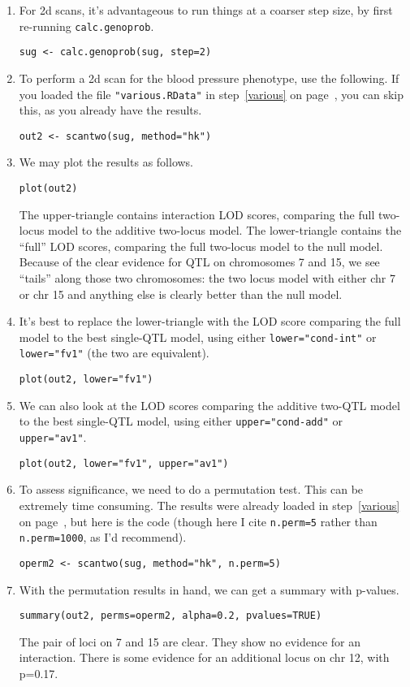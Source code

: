 \documentclass[10pt,letterpaper]{article}
\newcommand{\usercolor}{\color [named]{BlueViolet}}
\begin{document}
\begin{enumerate}
\addtocounter{enumi}{45}
\item For 2d scans, it's advantageous to run things at a coarser step
  size, by first re-running \verb-calc.genoprob-.

\usercolor
\verb|sug <- calc.genoprob(sug, step=2)|
\normalcolor

\item To perform a 2d scan for the blood pressure phenotype, use the
  following.  If you loaded the file \verb-"various.RData"- in
  step~\ref{various} on page~\pageref{various},
  you can skip this, as you already have the results.

\usercolor
\verb|out2 <- scantwo(sug, method="hk")|
\normalcolor

\item We may plot the results as follows.

\usercolor
\verb|plot(out2)|
\normalcolor

The upper-triangle contains interaction LOD scores, comparing the full
two-locus model to the additive two-locus model.  The lower-triangle
contains the ``full'' LOD scores, comparing the full two-locus model
to the null model.  Because of the clear evidence for QTL on
chromosomes 7 and 15, we see ``tails'' along those two chromosomes:
the two locus model with either chr 7 or chr 15 and anything else is clearly better
than the null model.  

\item It's best to replace the lower-triangle with the LOD score comparing the full model to
  the best single-QTL model, using either \verb:lower="cond-int": or
  \verb:lower="fv1": (the two are equivalent).

\usercolor
\verb|plot(out2, lower="fv1")|
\normalcolor

\item We can also look at the LOD scores comparing the additive
  two-QTL model to the best single-QTL model, using either
  \verb:upper="cond-add": or \verb:upper="av1":.

\usercolor
\verb|plot(out2, lower="fv1", upper="av1")|
\normalcolor

\item To assess significance, we need to do a permutation test.  This
  can be extremely time consuming.  The results were already loaded in
  step~\ref{various} on page~\pageref{various}, but here is the code (though here I cite \verb:n.perm=5:
  rather than \verb:n.perm=1000:, as I'd recommend).

\usercolor
\verb|operm2 <- scantwo(sug, method="hk", n.perm=5)|
\normalcolor

\item With the permutation results in hand, we can get a summary with
  p-values.

\usercolor
\verb|summary(out2, perms=operm2, alpha=0.2, pvalues=TRUE)|
\normalcolor

The pair of loci on 7 and 15 are clear.  They show no evidence for an
interaction.  There is some evidence for an additional locus on chr
12, with p=0.17.

\end{enumerate}
\end{document}
